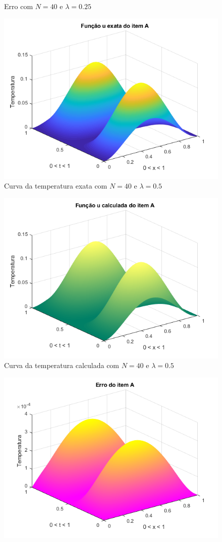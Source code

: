 \documentclass[12pt]{article}
\begin{document}
\begin{spacing}{1.5}
\begin{figure}
    \caption{Erro com $N=40$ e $\lambda=0.25$}
    \label{fig:A_n40lambda0-25_erro}
\end{figure}
\begin{figure}
    \centering
    \includegraphics[width=0.8\linewidth]{Primeira_Tarefa/ItemA/n40_lambda0-5_exata.png}
    \caption{Curva da temperatura exata com $N=40$ e $\lambda=0.5$}
    \label{fig:A_n40lambda0-5_exata}
\end{figure}
\begin{figure}
    \centering
    \includegraphics[width=0.8\linewidth]{Primeira_Tarefa/ItemA/n40_lambda0-5_calc.png}
    \caption{Curva da temperatura calculada com $N=40$ e $\lambda=0.5$}
    \label{fig:A_n40lambda0-5_calc}
\end{figure}
\begin{figure}
    \centering
    \includegraphics[width=0.8\linewidth]{Primeira_Tarefa/ItemA/n40_lambda0-5_erro.png}

\end{figure}
\end{spacing}
\end{document}
